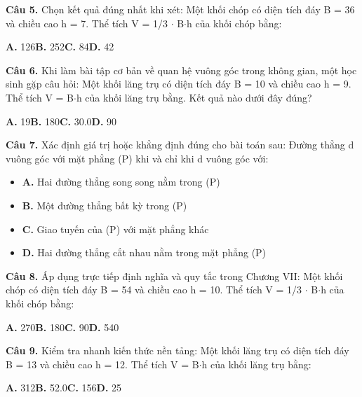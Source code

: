 \documentclass[11pt,a4paper]{article}
\begin{document}
\textbf{\color{primary} Câu 5.} Chọn kết quả đúng nhất khi xét: Một khối chóp có diện tích đáy B = 36 và chiều cao h = 7. Thể tích V = 1/3 $\cdot$ B$\cdot$h của khối chóp bằng:\par
\hspace*{1.5em}\textbf{A.} 126\quad\quad \textbf{B.} 252\quad\quad \textbf{C.} 84\quad\quad \textbf{D.} 42\par\vspace{2pt}
\textbf{\color{primary} Câu 6.} Khi làm bài tập cơ bản về quan hệ vuông góc trong không gian, một học sinh gặp câu hỏi: Một khối lăng trụ có diện tích đáy B = 10 và chiều cao h = 9. Thể tích V = B$\cdot$h của khối lăng trụ bằng. Kết quả nào dưới đây đúng?\par
\hspace*{1.5em}\textbf{A.} 19\quad\quad \textbf{B.} 180\quad\quad \textbf{C.} 30.0\quad\quad \textbf{D.} 90\par\vspace{2pt}
\textbf{\color{primary} Câu 7.} Xác định giá trị hoặc khẳng định đúng cho bài toán sau: Đường thẳng d vuông góc với mặt phẳng (P) khi và chỉ khi d vuông góc với:\par
\begin{itemize}\setlength{\itemsep}{1pt}\setlength{\parskip}{0pt}
  \item[] \textbf{A.} Hai đường thẳng song song nằm trong (P)
  \item[] \textbf{B.} Một đường thẳng bất kỳ trong (P)
  \item[] \textbf{C.} Giao tuyến của (P) với mặt phẳng khác
  \item[] \textbf{D.} Hai đường thẳng cắt nhau nằm trong mặt phẳng (P)
\end{itemize}\vspace{2pt}
\textbf{\color{primary} Câu 8.} Áp dụng trực tiếp định nghĩa và quy tắc trong Chương VII: Một khối chóp có diện tích đáy B = 54 và chiều cao h = 10. Thể tích V = 1/3 $\cdot$ B$\cdot$h của khối chóp bằng:\par
\hspace*{1.5em}\textbf{A.} 270\quad\quad \textbf{B.} 180\quad\quad \textbf{C.} 90\quad\quad \textbf{D.} 540\par\vspace{2pt}
\textbf{\color{primary} Câu 9.} Kiểm tra nhanh kiến thức nền tảng: Một khối lăng trụ có diện tích đáy B = 13 và chiều cao h = 12. Thể tích V = B$\cdot$h của khối lăng trụ bằng:\par
\hspace*{1.5em}\textbf{A.} 312\quad\quad \textbf{B.} 52.0\quad\quad \textbf{C.} 156\quad\quad \textbf{D.} 25\par\vspace{2pt}
\end{document}
